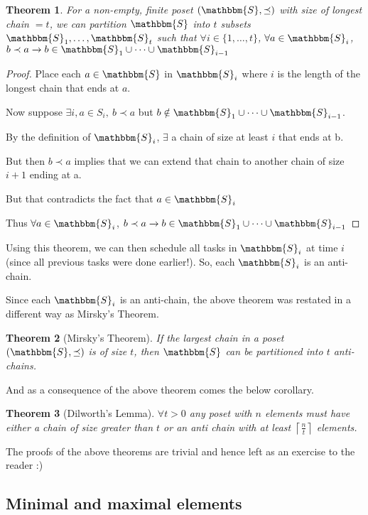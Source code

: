 \documentclass[14pt]{extarticle}
\newcommand{\impl}{\xrightarrow{}}
\newcommand{\Sset}{\mathbbm{S}}
\newcommand{\pordereq}{\preceq}
\newcommand{\porder}{\prec}
\newtheorem{theorem}{Theorem}
\begin{document}
\begin{theorem}
    For a non-empty, finite poset $(\Sset, \pordereq)$ with size of longest chain $= t$, we can partition $\Sset$ into $t$ subsets $\Sset_1, \dots, \Sset_t$ such that $\forall i \in \{1, \dots, t\}$, $\forall a \in \Sset_i$, $b \porder a \impl b \in \Sset_1 \cup \dots \cup \Sset_{i-1}$
\end{theorem}

\begin{proof}
    Place each $a \in \Sset$ in $\Sset_i$ where $i$ is the length of the longest chain that ends at $a$.

    Now suppose $\exists i, a \in S_i, \ b \porder a$ but $b \notin \Sset_1 \cup \dots \cup \Sset_{i-1}$.

    By the definition of $\Sset_i$, $\exists$ a chain of size at least $i$ that ends at b.

    But then $b \porder a$ implies that we can extend that chain to another chain of size $i+1$ ending at a.

    But that contradicts the fact that $a \in \Sset_i$

    Thus $\forall a \in \Sset_i$, $b \porder a \impl b \in \Sset_1 \cup \dots \cup \Sset_{i-1}$
\end{proof}

Using this theorem, we can then schedule all tasks in $\Sset_i$ at time $i$ (since all previous tasks were done earlier!). So, each $\Sset_i$ is an anti-chain.

Since each $\Sset_i$ is an anti-chain, the above theorem was restated in a different way as Mirsky's Theorem.

\begin{theorem}[Mirsky's Theorem]
    If the largest chain in a poset $(\Sset, \pordereq)$ is of size $t$, then $\Sset$ can be partitioned into $t$ anti-chains.
\end{theorem}

And as a consequence of the above theorem comes the below corollary.

\begin{theorem}[Dilworth's Lemma]
    $\forall t > 0$ any poset with $n$ elements must have either a chain of size greater than $t$ or an anti chain with at least $\left \lceil \frac{n}{t} \right \rceil$ elements.
\end{theorem}

The proofs of the above theorems are trivial and hence left as an exercise to the reader :)

\subsection{Minimal and maximal elements}
\end{document}
